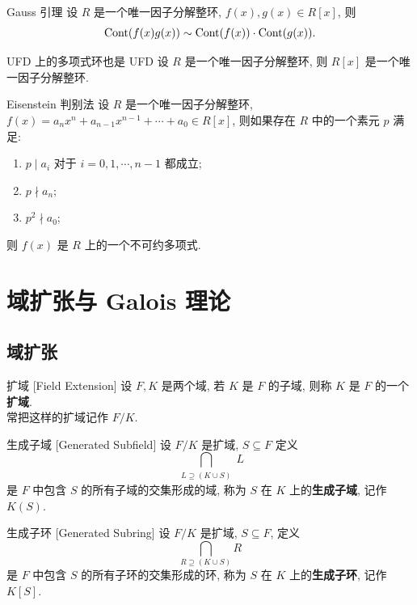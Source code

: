         \begin{thm}
            {Gauss 引理}
            设 \(R\) 是一个唯一因子分解整环, \(f(x), g(x)\in R[x]\), 则
            \[\operatorname{Cont}(f(x)g(x))\sim \operatorname{Cont}(f(x))\cdot \operatorname{Cont}(g(x)).\]
        \end{thm}

        \begin{thm}
            {UFD 上的多项式环也是 UFD}
            设 \(R\) 是一个唯一因子分解整环, 则 \(R[x]\) 是一个唯一因子分解整环. 
        \end{thm}

        \begin{thm}
            {Eisenstein 判别法}
            设 \(R\) 是一个唯一因子分解整环, \(f(x)=a_n x^n + a_{n-1} x^{n-1} + \cdots + a_0\in R[x]\), 则如果存在 \(R\) 中的一个素元 \(p\) 满足:
            \begin{enumerate}
                \item \(p\mid a_i\) 对于 \(i=0,1,\cdots,n-1\) 都成立;
                \item \(p\nmid a_n\);
                \item \(p^2\nmid a_0\);
            \end{enumerate}
            则 \(f(x)\) 是 \(R\) 上的一个不可约多项式.
        \end{thm}

\section{域扩张与 Galois 理论}

    \subsection{域扩张}

        \begin{dfn}
            {扩域}
            [Field Extension]
            设 \(F,K\) 是两个域, 若 \(K\) 是 \(F\) 的子域, 则称 \(K\) 是 \(F\) 的一个\textbf{扩域}.\\
            常把这样的扩域记作 \(F/K\).
        \end{dfn}

        \begin{dfn}
            {生成子域}
            [Generated Subfield]
            设 \(F/K\) 是扩域, \(S\subseteq F\) 定义
            \[\bigcap_{\substack{L\supseteq (K\cup S)}} L\]
            是 \(F\) 中包含 \(S\) 的所有子域的交集形成的域, 称为 \(S\) 在 \(K\) 上的\textbf{生成子域}, 记作 \(K(S)\).
        \end{dfn}
        \begin{dfn}
            {生成子环}
            [Generated Subring]
            设 \(F/K\) 是扩域, \(S\subseteq F\), 定义
            \[\bigcap_{R\supseteq (K\cup S)} R\]
            是 \(F\) 中包含 \(S\) 的所有子环的交集形成的环, 称为 \(S\) 在 \(K\) 上的\textbf{生成子环}, 记作 \(K[S]\).
        \end{dfn}

